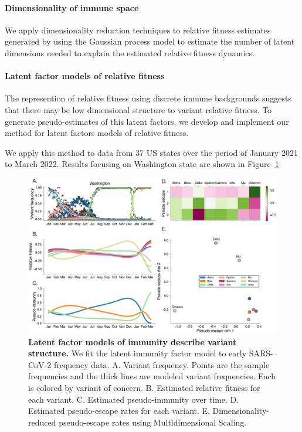\documentclass[12pt,oneside,letterpaper]{article}
\begin{document}
\paragraph{Dimensionality of immune space}%

We apply dimensionality reduction techniques to relative fitness estimates generated by using the Gaussian process model to estimate the number of latent dimensions needed to explain the estimated relative fitness dynamics.


\paragraph{Latent factor models of relative fitness}

The represention of relative fitness using discrete immune backgrounds suggests that there may be low dimensional structure to variant relative fitness.
To generate pseudo-estimates of this latent factors, we develop and implement our method for latent factors models of relative fitness.

We apply this method to data from 37 US states over the period of January 2021 to March 2022. Results focusing on Washington state are shown in Figure~\ref{fig:latent_immune}

\begin{figure}[h]
    \centering
    \includegraphics[width=0.8\linewidth]{./figures/latent_immune.png}
    \caption{\textbf{Latent factor models of immunity describe variant structure.} 
        We fit the latent immunity factor model to early SARS-CoV-2 frequency data.
        A. Variant frequency. Points are the sample frequencies and the thick lines are modeled variant frequencies. Each is colored by variant of concern.
        B. Estimated relative fitness for each variant.
        C. Estimated pseudo-immunity over time.
        D. Estimated pseudo-escape rates for each variant.
        E. Dimensionality-reduced pseudo-escape rates using Multidimensional Scaling.
    }
\label{fig:latent_immune}
\end{figure}
\end{document}
